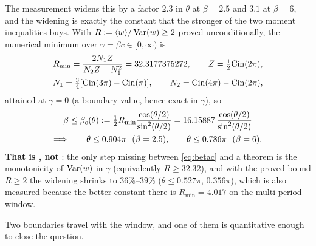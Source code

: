 \noindent
The measurement widens this by a factor $2.3$ in $\theta$ at $\beta=2.5$ and $3.1$ at $\beta=6$, and
the widening is exactly the constant that the stronger of the two moment inequalities buys. With $R:=\langle w\rangle/\operatorname{Var}(w)\ge2$ proved
unconditionally, the numerical minimum over $\gamma=\beta c\in[0,\infty)$ is
\begin{gather}
R_{\min}=\frac{2N_{1}Z}{N_{2}Z-N_{1}^{2}}=32.3177375272,\qquad
Z=\tfrac12\mathrm{Cin}(2\pi),\notag\\
N_{1}=\tfrac34[\mathrm{Cin}(3\pi)-\mathrm{Cin}(\pi)],\qquad
N_{2}=\mathrm{Cin}(4\pi)-\mathrm{Cin}(2\pi),
\label{eq:Rmin}
\end{gather}
attained at $\gamma=0$ (a boundary value, hence exact in $\gamma$), so
\begin{gather}
\beta\le\beta_{c}(\theta):=\tfrac12 R_{\min}\frac{\cos(\theta/2)}{\sin^{2}(\theta/2)}
=16.15887\,\frac{\cos(\theta/2)}{\sin^{2}(\theta/2)}\notag\\
\Longrightarrow\qquad
\theta\le0.904\pi\ \ (\beta=2.5),\qquad \theta\le0.786\pi\ \ (\beta=6).
\label{eq:betac}
\end{gather}
\textbf{That is \LE, not \LC}: the only step missing between \eqref{eq:betac} and a theorem is the
monotonicity of $\operatorname{Var}(w)$ in $\gamma$ (equivalently $R\ge32.32$), and with the proved bound $R\ge2$ the
widening shrinks to $36\%$--$39\%$ ($\theta\le0.527\pi$, $0.356\pi$), which is also measured because the
better constant there is $R_{\min}=4.017$ on the multi-period window.

\noindent
Two boundaries travel with the window, and one of them is quantitative enough to close the question.

